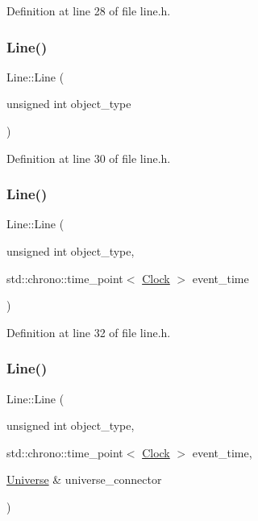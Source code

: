 Definition at line 28 of file line.\+h.

\mbox{\label{class_line_a4e3242660d8d3c1aa43e932560840552}} 
\subsubsection{\texorpdfstring{Line()}{Line()}\hspace{0.1cm}{\footnotesize\ttfamily [2/4]}}
{\footnotesize\ttfamily Line\+::\+Line (\begin{DoxyParamCaption}\item[{unsigned int}]{object\+\_\+type }\end{DoxyParamCaption})\hspace{0.3cm}{\ttfamily [inline]}}



Definition at line 30 of file line.\+h.

\mbox{\label{class_line_a5330353765ab0f965a4293bdc7c3564a}} 
\subsubsection{\texorpdfstring{Line()}{Line()}\hspace{0.1cm}{\footnotesize\ttfamily [3/4]}}
{\footnotesize\ttfamily Line\+::\+Line (\begin{DoxyParamCaption}\item[{unsigned int}]{object\+\_\+type,  }\item[{std\+::chrono\+::time\+\_\+point$<$ \hyperlink{universe_8h_a0ef8d951d1ca5ab3cfaf7ab4c7a6fd80}{Clock} $>$}]{event\+\_\+time }\end{DoxyParamCaption})\hspace{0.3cm}{\ttfamily [inline]}}



Definition at line 32 of file line.\+h.

\mbox{\label{class_line_a740aacdf468a1519f9a01d9cbd1f9219}} 
\subsubsection{\texorpdfstring{Line()}{Line()}\hspace{0.1cm}{\footnotesize\ttfamily [4/4]}}
{\footnotesize\ttfamily Line\+::\+Line (\begin{DoxyParamCaption}\item[{unsigned int}]{object\+\_\+type,  }\item[{std\+::chrono\+::time\+\_\+point$<$ \hyperlink{universe_8h_a0ef8d951d1ca5ab3cfaf7ab4c7a6fd80}{Clock} $>$}]{event\+\_\+time,  }\item[{\hyperlink{class_universe}{Universe} \&}]{universe\+\_\+connector }\end{DoxyParamCaption})\hspace{0.3cm}{\ttfamily [inline]}}



